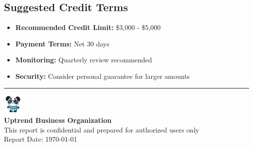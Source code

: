 \documentclass[11pt,a4paper]{article}
\begin{document}
\subsection{Suggested Credit Terms}
\begin{itemize}
    \item \textbf{Recommended Credit Limit:} \$3,000 - \$5,000
    \item \textbf{Payment Terms:} Net 30 days
    \item \textbf{Monitoring:} Quarterly review recommended
    \item \textbf{Security:} Consider personal guarantee for larger amounts
\end{itemize}

\vfill
\begin{center}
\hrule
\vspace{0.3cm}
\includegraphics[height=1cm]{uptrend_mascot.png}\\[0.2cm]
\textcolor{uptrendblue}{\textbf{Uptrend Business Organization}}\\
\textcolor{uptrendgray}{\small This report is confidential and prepared for authorized users only}\\
\textcolor{uptrendgray}{\small Report Date: \today}
\end{center}
\end{document}
